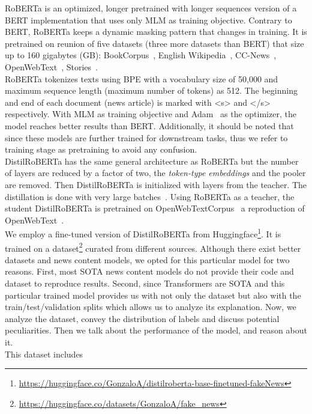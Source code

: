 RoBERTa is an optimized, longer pretrained with longer sequences version of a BERT implementation that uses only MLM
as training objective. Contrary to BERT, RoBERTa keeps a dynamic masking pattern that changes in training. It is
pretrained on reunion of five datasets (three more datasets than BERT) that size up to 160 gigabytes (GB): BookCorpus~\parencite{BookCorpus_Yukun},
English Wikipedia~\parencite{EnglishWikipedia_Wiki},
CC-News~\parencite{CCNews_Nagel}, OpenWebText~\parencite{OpenWebText_Radford},
Stories~\parencite{ASimpleMethodForCommonsenseReasoning_Trinh}.\\
RoBERTa tokenizes texts using BPE with a vocabulary size of 50,000 and maximum sequence length (maximum number of tokens) as 512. The beginning and end of each document (news article) is marked with <s> and </s> respectively. With MLM as training objective and Adam~\parencite*{Adam_Kingma} as the optimizer, the model reaches better results than BERT. Additionally, it should be noted that since these models are further trained for downstream tasks, thus we refer to training stage as pretraining to avoid any confusion.\\
DistilRoBERTa has the same general architecture as RoBERTa but the number of layers are reduced by a factor of two, the
\emph{token-type embeddings} and the pooler are removed. Then DistilRoBERTa is initialized with layers from the teacher.
The distillation is done with very large batches~\parencite{DistilBERT_Sanh}. Using RoBERTa as a teacher, the student DistilRoBERTa is pretrained on OpenWebTextCorpus~\parencite{OpenWebTextCorpus_Gokaslan} a reproduction of OpenWebText~\parencite{OpenWebText_Radford}.\\
We employ a fine-tuned version of DistilRoBERTa from
Huggingface\footnote{\url{https://huggingface.co/GonzaloA/distilroberta-base-finetuned-fakeNews}}. It is trained on a dataset\footnote{\url{https://huggingface.co/datasets/GonzaloA/fake_news}} curated from different sources. Although there exist better datasets and news content models, we opted for this particular model for two reasons. First, most SOTA news content models
do not provide their code and dataset to reproduce results. Second, since Transformers are SOTA and this particular trained model provides us with not only the dataset but also with the train/test/validation splits which allows us to analyze its explanation. Now, we analyze the dataset, convey the distribution of labels and discuss potential peculiarities. Then we
talk about the performance of the model, and reason about it.\\
This dataset includes

